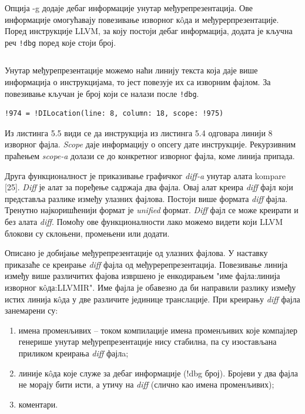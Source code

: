 \documentclass[12pt,oneside]{memoir}
\begin{document}
Опција -g додаје дебаг информације унутар међурепрезентација.
Ове информације омогућавају повезивање изворног к\^{o}да и међурерпрезентације.
Поред инструкције LLVM, за коју постоји дебаг информација, додата је кључна реч
\texttt{!dbg} поред које стоји број.
\begin{lstlisting}[frame=single, caption=Пример debug кључне речи, captionpos=b]
  %4 = mul nsw i32 %0, %0, !dbg !974
\end{lstlisting}
Унутар међурепрезентације можемо наћи линију текста која даје више информација о
инструкцијама, то јест повезује их са изворним фајлом.
За повезивање кључан је број који се налази после \texttt{!dbg}.
\begin{lstlisting}[frame=single, caption=Пример debug линије која повезује изворни к\^{o}д са међурепрезентацијом, captionpos=b]
!974 = !DILocation(line: 8, column: 18, scope: !975)
\end{lstlisting}

Из листинга 5.5 види се да инструкција из листинга 5.4 одговара линији 8 изворног фајла.
\textit{Scope} даје информацију о опсегу дате инструкције.
Рекурзивним праћењем \textit{scope-a} долази се до конкретног изворног фајла, коме линија припада.

Друга функционалност је приказивање графичког \textit{diff-a} унутар алата kompare [25].
\textit{Diff} је алат за поређење садржаја два фајла.
Овај алат креира \textit{diff} фајл који представља разлике између улазних фајлова.
Постоји више формата \textit{diff} фајла. 
Тренутно најкоришћенији формат је \textit{unified} формат.
\textit{Diff} фајл се може креирати и без алата \textit{diff}.
Помоћу ове функционалности лако можемо видети који LLVM блокови су склоњени, 
промењени или додати.

Описано је добијање међурепрезентације од улазних фајлова.
У наставку приказаће се креирање \textit{diff} фајла од међуререпрезентација.
Повезивање линија између више различитих фајова извршено је енкодирањем "име фајла:линија изворног  к\^{o}да:LLVMIR".
Име фајла је обавезно да би направили разлику између истих линија  к\^{o}да у две различите јединице транслације.
При креирању \textit{diff} фајла занемарени су:
\begin{enumerate}
\item имена променљивих -- током компилације имена променљивих које компајлер генерише унутар међурепрезентације нису стабилна, па су изостављана приликом
креирања \textit{diff} фајлa; 
\item линије к\^{o}да које служе за дебаг информације (!dbg број). Бројеви у два
	фајла не морају бити исти, а утичу на \textit{diff} (слично као имена променљивих);
\item коментари.
\end{enumerate}
\end{document}
